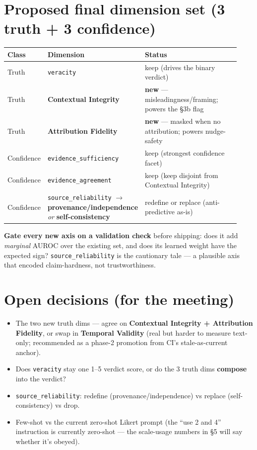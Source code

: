 \documentclass[11pt]{article}
\begin{document}
\hrulefill

\section{Proposed final dimension set (3 truth + 3 confidence)}

\begin{longtable}{@{}>{\raggedright\arraybackslash}p{0.13\linewidth}
  >{\raggedright\arraybackslash}p{0.32\linewidth}
  >{\raggedright\arraybackslash}p{0.48\linewidth}@{}}
\toprule
\textbf{Class} & \textbf{Dimension} & \textbf{Status} \\
\midrule
Truth & \texttt{veracity} & keep (drives the binary verdict) \\
Truth & \textbf{Contextual Integrity} & \textbf{new} --- misleadingness/framing; powers the
\S3b flag \\
Truth & \textbf{Attribution Fidelity} & \textbf{new} --- masked when no attribution; powers
nudge-safety \\
Confidence & \texttt{evidence\_sufficiency} & keep (strongest confidence facet) \\
Confidence & \texttt{evidence\_agreement} & keep (keep disjoint from Contextual Integrity) \\
Confidence & \texttt{source\_reliability} $\rightarrow$ \textbf{provenance/independence}
\emph{or} \textbf{self-consistency} & redefine or replace (anti-predictive as-is) \\
\bottomrule
\end{longtable}

\textbf{Gate every new axis on a validation check} before shipping: does it add
\emph{marginal} AUROC over the existing set, and does its learned weight have the expected
sign? \texttt{source\_reliability} is the cautionary tale --- a plausible axis that encoded
claim-hardness, not trustworthiness.

\hrulefill

\section{Open decisions (for the meeting)}

\begin{itemize}[leftmargin=1.4em]
  \item The two new truth dims --- agree on \textbf{Contextual Integrity + Attribution
    Fidelity}, or swap in \textbf{Temporal Validity} (real but harder to measure text-only;
    recommended as a phase-2 promotion from CI's stale-as-current anchor).
  \item Does \texttt{veracity} stay one 1--5 verdict score, or do the 3 truth dims
    \textbf{compose} into the verdict?
  \item \texttt{source\_reliability}: redefine (provenance/independence) vs replace
    (self-consistency) vs drop.
  \item Few-shot vs the current zero-shot Likert prompt (the ``use 2 and 4'' instruction is
    currently zero-shot --- the scale-usage numbers in \S5 will say whether it's obeyed).
\end{itemize}
\end{document}
